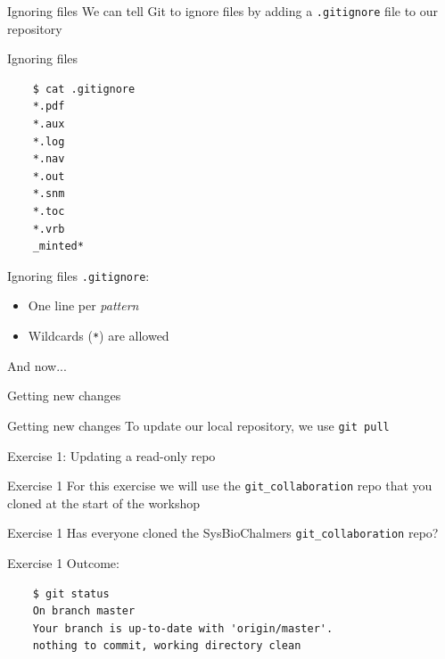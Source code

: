 \documentclass{beamer}
\newcommand{\fmtcmd}[1]{\texttt{#1}}
\begin{document}
\begin{frame}{Ignoring files}
  \center
  \Huge We can tell Git to ignore files by adding a
  \fmtcmd{.gitignore} file to our repository
\end{frame}

\begin{frame}[fragile]{Ignoring files}
  \begin{verbatim}
    $ cat .gitignore
    *.pdf
    *.aux
    *.log
    *.nav
    *.out
    *.snm
    *.toc
    *.vrb
    _minted*
  \end{verbatim}
\end{frame}

\begin{frame}{Ignoring files}
  \fmtcmd{.gitignore}:
  \begin{itemize}
    \item One line per \emph{pattern}
    \item Wildcards (\fmtcmd{*}) are allowed
  \end{itemize}
\end{frame}

\begin{frame}{}
  \center
  \Huge And now...
\end{frame}

\begin{frame}{}
  \center
  \Huge Getting new changes
\end{frame}

\begin{frame}{Getting new changes}
  \center
  \Huge To update our local repository, we use \fmtcmd{git
    pull}
\end{frame}

\begin{frame}{}
  \center
  \Huge Exercise 1: Updating a read-only repo
\end{frame}

\begin{frame}{Exercise 1}
  \center
  \LARGE For this exercise we will use the \fmtcmd{git_collaboration}
  repo that you cloned at the start of the workshop
\end{frame}

\begin{frame}{Exercise 1}
  \center
  \Huge Has everyone cloned the SysBioChalmers
  \fmtcmd{git_collaboration} repo?
\end{frame}

\begin{frame}[fragile]{Exercise 1}
  Outcome:

  \begin{verbatim}
    $ git status
    On branch master
    Your branch is up-to-date with 'origin/master'.
    nothing to commit, working directory clean
  \end{verbatim}
\end{frame}
\end{document}
